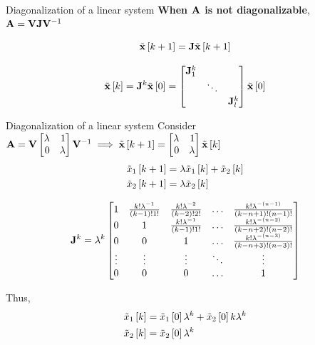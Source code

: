 \documentclass[aspectratio=169]{beamer}
\def\mf{\ensuremath\mathbf}
\def\lp{\ensuremath\left(}
\def\rp{\ensuremath\right)}
\def\ls{\ensuremath\left[}
\def\rs{\ensuremath\right]}
\def\bmx{\ensuremath\begin{bmatrix*}[r]}
\def\emx{\ensuremath\end{bmatrix*}}
\def\bmxc{\ensuremath\begin{bmatrix*}[c]}
\newcommand{\dt}[1]{\ls #1\rs}
\begin{document}
\begin{frame}[t]{Diagonalization of a linear system}
\textbf{When $\mf{A}$ is not diagonalizable}, $\mf{A} = \mf{V}\mf{J}\mf{V}^{-1}$

\[ \tilde{\mf{x}}\dt{k+1} = \mf{J}\tilde{\mf{x}}\dt{k+1} \] \vspace{-0.8cm}

\[ \tilde{\mf{x}}\dt{k} = \mf{J}^k\tilde{\mf{x}}\dt{0} = \bmx 
 \mf{J}_1^k & & \\
 & \ddots & \\
 & &  \mf{J}_l^k
\emx \tilde{\mf{x}}\dt{0} \]
\end{frame}

\begin{frame}[t]{Diagonalization of a linear system}
Consider $\mf{A} = \mf{V}\bmx \lambda & 1 \\ 0 & \lambda\emx\mf{V}^{-1} \implies \tilde{\mf{x}}\dt{k+1} = \bmx \lambda & 1 \\ 0 & \lambda\emx\tilde{\mf{x}}\dt{k}$ \vspace{-0.25cm}
\[ \begin{split}
\tilde{x}_1\dt{k+1} &= \lambda\tilde{x}_1\dt{k} + \tilde{x}_2\dt{k}\\
\tilde{x}_2\dt{k+1} &= \lambda\tilde{x}_2\dt{k}
\end{split} \]\vspace{-0.75cm}

\[ \mf{J}^k = \lambda^k \bmxc 
1 & \frac{k!\lambda^{-1}}{\lp k-1\rp!1!} & \frac{k!\lambda^{-2}}{\lp k-2\rp! 2!} & \ldots & \frac{k!\lambda^{-\lp n - 1\rp}}{\lp k-n+1\rp! \lp n - 1\rp!}\\ 
0 & 1 & \frac{k!\lambda^{-1}}{\lp k-1\rp! 1!} & \ldots & \frac{k!\lambda^{-\lp n - 2\rp}}{\lp k-n+2\rp! \lp n - 2\rp!}\\
0 & 0 & 1 & \ldots & \frac{k!\lambda^{-\lp n - 3\rp}}{\lp k-n+3\rp! \lp n - 3\rp!}\\
\vdots & \vdots & \vdots & \ddots & \vdots\\
0 & 0 & 0 & \ldots & 1
\emx \]\vspace{-0.25cm}

Thus, \vspace{-0.25cm}
\[ \begin{split}
\tilde{x}_1\dt{k} &= \tilde{x}_1\dt{0}\lambda^k + \tilde{x}_2\dt{0}k\lambda^k\\
\tilde{x}_2\dt{k} &= \tilde{x}_2\dt{0}\lambda^k
\end{split} \]
\end{frame}
\end{document}
